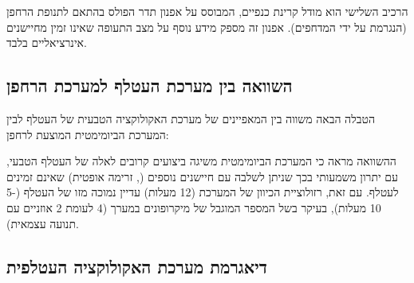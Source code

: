 הרכיב השלישי הוא מודל קרינת כנפיים, המבוסס על אפנון תדר הפולס בהתאם לתנופת הרחפן (הנגרמת על ידי המדחפים). אפנון זה מספק מידע נוסף על מצב התעופה שאינו זמין מחיישנים אינרציאליים בלבד. \cite{GriffithBatEcholocation}

\subsection{השוואה בין מערכת העטלף למערכת הרחפן}
\label{sec:ch02_comparison}

הטבלה הבאה משווה בין המאפיינים של מערכת האקולוקציה הטבעית של העטלף לבין המערכת הביומימטית המוצעת לרחפן:

\begin{table}[htbp]
\centering
\caption{השוואה בין מערכת האקולוקציה העטלפית למערכת הרחפן הביומימטית. (Comparison between bat echolocation system and proposed bio-mimetic drone system.)}
\label{tab:ch02_comparison}
\end{table}

ההשוואה מראה כי המערכת הביומימטית משיגה ביצועים קרובים לאלה של העטלף הטבעי, עם יתרון משמעותי בכך שניתן לשלבה עם חיישנים נוספים (, זרימה אופטית) שאינם זמינים לעטלף. עם זאת, רזולוציית הכיוון של המערכת (12 מעלות) עדיין נמוכה מזו של העטלף (5-10 מעלות), בעיקר בשל המספר המוגבל של מיקרופונים במערך (4 לעומת 2 אוזניים עם תנועה עצמאית). \cite{GriffinBatEcholocation} \cite{CrewAIDocs}

\subsection{דיאגרמת מערכת האקולוקציה העטלפית}
\label{sec:ch02_diagram}

